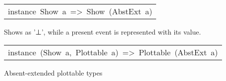 \begin{haddockdesc}
\item[\begin{tabular}{@{}l}
instance\ Show\ a\ =>\ Show\ (AbstExt\ a)
\end{tabular}]\haddockbegindoc
Shows  as '⊥', while a present event is represented
 with its value.\par


\item[\begin{tabular}{@{}l}
instance\ (Show\ a,\ Plottable\ a)\ =>\ Plottable\ (AbstExt\ a)
\end{tabular}]\haddockbegindoc
Absent-extended plottable types\par

\end{haddockdesc}